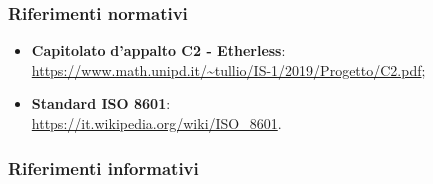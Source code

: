 	\subsubsection{Riferimenti normativi}
	\begin{itemize}
		\item \textbf{Capitolato}\textbf{ d'appalto C2 - Etherless}: \\
			\url{https://www.math.unipd.it/~tullio/IS-1/2019/Progetto/C2.pdf};
		\item \textbf{Standard ISO 8601}: \\
			\url{https://it.wikipedia.org/wiki/ISO_8601}.	
	\end{itemize}
		
	\subsubsection{Riferimenti informativi}
